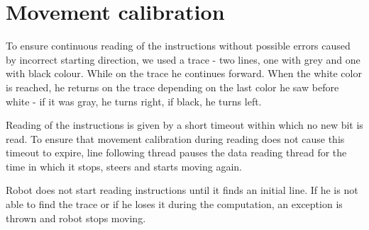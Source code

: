 \section{Movement calibration}
To ensure continuous reading of the instructions without possible errors caused by incorrect starting direction, we used a trace - two lines, one with grey and one with black colour. While on the trace he continues forward. When the white color is reached, he returns on the trace depending on the last color he saw before white - if it was gray, he turns right, if black, he turns left. 

Reading of the instructions is given by a short timeout within which no new bit is read. To ensure that movement calibration during reading does not cause this timeout to expire, line following thread pauses the data reading thread for the time in which it stops, steers and starts moving again.

Robot does not start reading instructions until it finds an initial line. If he is not able to find the trace or if he loses it during the computation, an exception is thrown and robot stops moving.